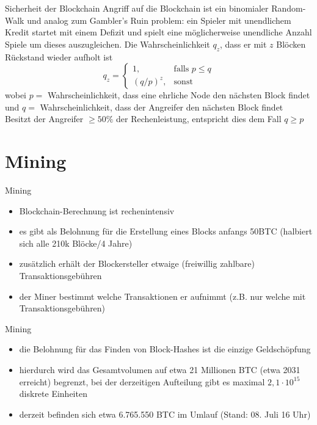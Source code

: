 \documentclass[handout]{beamer} \usepackage[german]{babel}
\begin{document}
\begin{frame}{Sicherheit der Blockchain}
	Angriff auf die Blockchain ist ein binomialer Random-Walk und analog zum Gambler's Ruin problem: ein
	Spieler mit unendlichem Kredit startet mit einem Defizit und spielt eine
	möglicherweise unendliche Anzahl Spiele um dieses auszugleichen.
	Die Wahrscheinlichkeit $q_z$, dass er mit $z$ Blöcken Rückstand wieder aufholt ist
	\begin{equation*}
		q_z = \left\{\begin{array}{cl} 1, & \mbox{falls }p\leq q\\
			\left( q/p \right)^z, & \mbox{sonst} \end{array}\right.
	\end{equation*}
	wobei
		$p=$ Wahrscheinlichkeit, dass eine ehrliche Node den nächsten Block
			findet und
		$q=$ Wahrscheinlichkeit, dass der Angreifer den nächsten Block
			findet\\
	Besitzt der Angreifer $\geq 50\%$ der Rechenleistung, entspricht dies dem
	Fall $q\ge p$
\end{frame}


\section{Mining}
\begin{frame}{Mining}
	\begin{itemize}
		\item Blockchain-Berechnung ist rechenintensiv
		\item es gibt als Belohnung für die Erstellung eines Blocks anfangs 50BTC
			(halbiert sich alle 210k Blöcke/4 Jahre)
		\item zusätzlich erhält der Blockersteller etwaige (freiwillig zahlbare) Transaktionsgebühren
		\item der Miner bestimmt welche Transaktionen er aufnimmt (z.B. nur
			welche mit Transaktionsgebühren)
	\end{itemize}
\end{frame}

\begin{frame}{Mining}
	\begin{itemize}
		\item die Belohnung für das Finden von Block-Hashes ist die einzige Geldschöpfung
		\item hierdurch wird das Gesamtvolumen auf etwa 21 Millionen BTC (etwa
			2031 erreicht) begrenzt, bei der derzeitigen Aufteilung gibt es
			maximal $2,1\cdot10^{15}$ diskrete Einheiten
		\item derzeit befinden sich etwa 6.765.550 BTC im Umlauf (Stand: 08. Juli
			16 Uhr)
	\end{itemize}
\end{frame}
\end{document}
